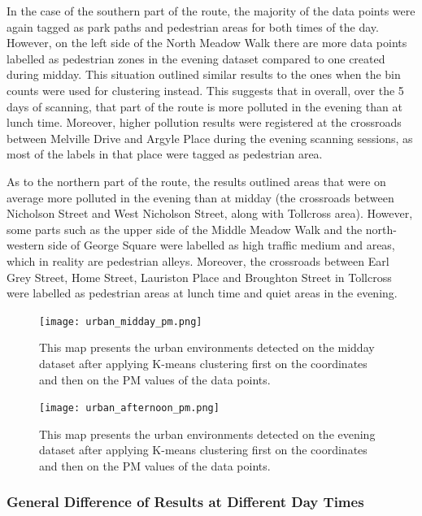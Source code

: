 \documentclass[bsc,frontabs,twoside,singlespacing, parskip,deptreport]{infthesis}     %
\begin{document}
In the case of the southern part of the route, the majority of the data points were again tagged as park paths and pedestrian areas for both times of the day. However, on the left side of the North Meadow Walk there are more data points labelled as pedestrian zones in the evening dataset compared to one created during midday. This situation outlined similar results to the ones when the bin counts were used for clustering instead. This suggests that in overall, over the 5 days of scanning, that part of the route is more polluted in the evening than at lunch time. Moreover, higher pollution results were registered at the crossroads between Melville Drive and Argyle Place during the evening scanning sessions, as most of the labels in that place were tagged as pedestrian area.

As to the northern part of the route, the results outlined areas that were on average more polluted in the evening than at midday (the crossroads between Nicholson Street and West Nicholson Street, along with Tollcross area). However, some parts such as the upper side of the Middle Meadow Walk and the north-western side of George Square were labelled as high traffic medium and areas, which in reality are pedestrian alleys. Moreover, the crossroads between Earl Grey Street, Home Street, Lauriston Place and Broughton Street in Tollcross were labelled as pedestrian areas at lunch time and quiet areas in the evening.


\begin{figure}[h!]
  \center
  \texttt{[image: urban\_midday\_pm.png]}
  \caption{This map presents the urban environments detected on the midday dataset after applying K-means clustering first on the coordinates and then on the PM values of the data points.}
  \label{fig:urban_midday_pm}
\end{figure}

\begin{figure}[h!]
  \center
  \texttt{[image: urban\_afternoon\_pm.png]}
  \caption{This map presents the urban environments detected on the evening dataset after applying K-means clustering first on the coordinates and then on the PM values of the data points.}
  \label{fig:urban_afternoon_pm}
\end{figure}

\subsubsection*{General Difference of Results at Different Day Times}
\end{document}
